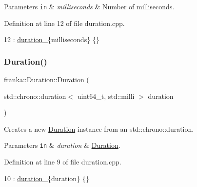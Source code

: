 \begin{DoxyParams}[1]{Parameters}
\mbox{\tt in}  & {\em milliseconds} & Number of milliseconds. \\
\hline
\end{DoxyParams}


Definition at line 12 of file duration.\+cpp.


\begin{DoxyCode}
12 : \hyperlink{classfranka_1_1Duration_ae446c403b200f0dbf92fb51ca21e82ff}{duration\_}\{milliseconds\} \{\}
\end{DoxyCode}
\mbox{\label{classfranka_1_1Duration_a389dfef50f34e9cc5be69838fbdafba7}} 
\subsubsection{\texorpdfstring{Duration()}{Duration()}\hspace{0.1cm}{\footnotesize\ttfamily [3/4]}}
{\footnotesize\ttfamily franka\+::\+Duration\+::\+Duration (\begin{DoxyParamCaption}\item[{std\+::chrono\+::duration$<$ uint64\+\_\+t, std\+::milli $>$}]{duration }\end{DoxyParamCaption})\hspace{0.3cm}{\ttfamily [noexcept]}}

Creates a new \hyperlink{classfranka_1_1Duration}{Duration} instance from an std\+::chrono\+::duration.


\begin{DoxyParams}[1]{Parameters}
\mbox{\tt in}  & {\em duration} & \hyperlink{classfranka_1_1Duration}{Duration}. \\
\hline
\end{DoxyParams}


Definition at line 9 of file duration.\+cpp.


\begin{DoxyCode}
10     : \hyperlink{classfranka_1_1Duration_ae446c403b200f0dbf92fb51ca21e82ff}{duration\_}\{duration\} \{\}
\end{DoxyCode}
\mbox{\label{classfranka_1_1Duration_a886575e716b45e85de1bb78def2eb133}} 
